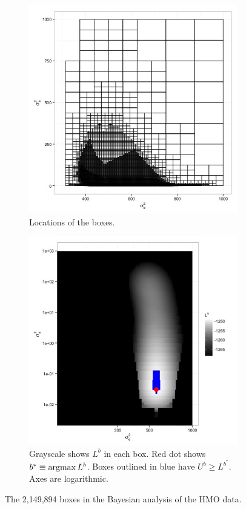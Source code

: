 \documentclass{report}
\newcommand{\argmax}{\operatornamewithlimits{argmax}}
\begin{document}
\begin{figure}
  \begin{subfigure}{.5\textwidth}
	\centering
	\includegraphics[width=.8\linewidth]{figs/hmo_HH11Bayes_boxes.jpg}
	\caption{Locations of the boxes.}
	\label{fig:hmoBayesboxes}
  \end{subfigure}
  \begin{subfigure}{.5\textwidth}
	\centering
	\includegraphics[width=.8\linewidth]{figs/hmo_HH11Bayes_rll.jpg}
	\caption{Grayscale shows $L^b$ in each box.  Red dot shows $b^* \equiv\argmax L^b$.
	Boxes outlined in blue have $U^b \ge L^{b^*}$.  Axes are logarithmic.}
	\label{fig:hmoBayesrll}
  \end{subfigure}
  \caption{The 2,149,894 boxes in the Bayesian analysis of the HMO data.}
  \label{fig:hmoBayes}
\end{figure}
\end{document}

